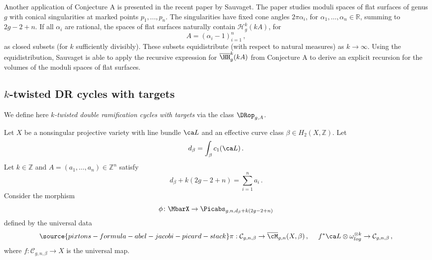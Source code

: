 Another application of Conjecture A is presented in the recent paper \cite{sauvaget_volumes} by Sauvaget. The paper studies moduli spaces of flat surfaces of genus $g$ with conical singularities at marked points $p_1, ..., p_n$. The singularities have fixed cone angles $2 \pi \alpha_i$, for $\alpha_1, \ldots, \alpha_n \in \mathbb{R}$, summing to $2g-2+n$.
If all $\alpha_i$ are rational,
the spaces of flat surfaces naturally contain $\mathcal{H}_g^k(k A )$,
for  $$A=(\alpha_i-1)_{i=1}^n\, ,$$
as closed subsets (for $k$ sufficiently divisibly). These subsets equidistribute (with respect to natural measures) as $k \to \infty$. Using the
equidistribution,
Sauvaget is able to apply the recursive expression for $\overline{\HH}_g^k(k A)$ from Conjecture A to derive an explicit recursion for the volumes of the moduli spaces of flat surfaces.

\subsection{\texorpdfstring{$k$}{k}-twisted DR cycles with targets} \label{Sect:ktwistedDR}
We define  here  {\em $k$-twisted double ramification cycles with targets} via the class $\DRop_{g,A}$.

Let $X$ be a nonsingular projective variety with line bundle $\ca L$ and
an effective curve class
$\beta \in H_2(X, \mathbb{Z})$. Let
$$d_\beta= \int_\beta c_1(\ca L)\, .$$
Let $k\in \mathbb{Z}$ and $A=(a_1,\ldots, a_n)\in \mathbb{Z}^n$ satisfy
\begin{equation*}
d_\beta + k(2g-2+n) = \sum_{i=1}^{n}a_i\, .
\end{equation*}
Consider the morphism
\[
\phi\colon \MbarX \to \Picabs_{g,n,d_\beta+k(2g-2+n)}
\]
defined by the universal data
\begin{equation}\label{fftt666774}
\source{pixtons-formula-abel-jacobi-picard-stack}
\pi: \mathcal{C}_{g,n,\beta} \rightarrow \overline{\cM}_{g,n}(X,\beta)\, , \ \ \ \
f^*\ca L\otimes \omega^{\otimes k}_{log}
\rightarrow \mathcal{C}_{g,n,\beta}\, ,
\end{equation}
where
$f: \mathcal{C}_{g,n,\beta} \to X$
is the universal map.

